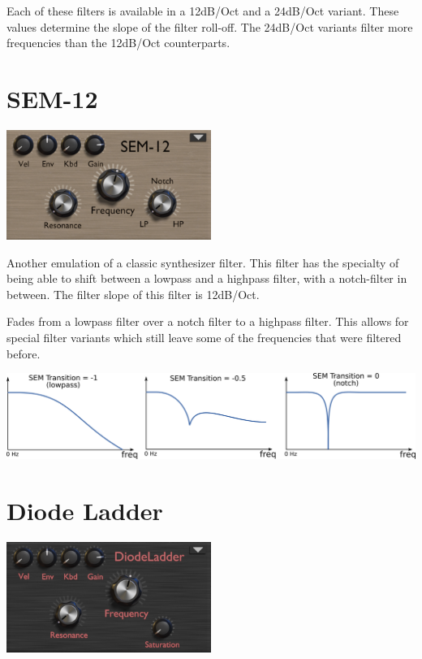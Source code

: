 Each of these filters is available in a 12dB/Oct and a 24dB/Oct variant. These values determine the slope of the filter roll-off. The 24dB/Oct variants filter more frequencies than the 12dB/Oct counterparts.

\section{SEM-12}
\begin{center}
    \includegraphics[width=0.5\textwidth]{graphics/SEM_filter.png}
\end{center}

Another emulation of a classic synthesizer filter. This filter has the specialty of being able to shift between a lowpass and a highpass filter, with a notch-filter in between. The filter slope of this filter is 12dB/Oct.

{Fades from a lowpass filter over a notch filter to a highpass filter. This allows for special filter variants which still leave some of the frequencies that were filtered before.

    \begin{center}
        \includegraphics[width=\textwidth]{graphics/SEM_transition.png}
    \end{center}
}

\section{Diode Ladder}
\begin{center}
    \includegraphics[width=0.5\textwidth]{graphics/diode_filter.png}
\end{center}


